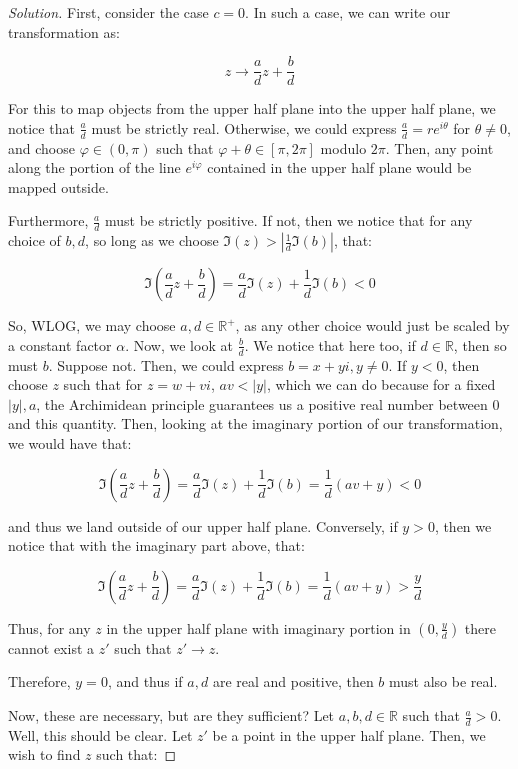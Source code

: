 \documentclass[10pt]{article}
\begin{document}
\begin{proof}[Solution]

First, consider the case $c = 0$. In such a case, we can write our transformation as:

$$ z \to \frac{a}{d} z + \frac{b}{d}$$

For this to map objects from the upper half plane into the upper half plane, we notice that $\frac{a}{d}$ must be strictly real. Otherwise, we could express $\frac{a}{d} = re^{i\theta}$ for $\theta \not = 0$, and choose $\varphi \in (0,\pi)$ such that $\varphi + \theta \in [\pi, 2\pi]$ modulo $2\pi$. Then, any point along the portion of the line $e^{i \varphi}$ contained in the upper half plane would be mapped outside.

Furthermore, $\frac{a}{d}$ must be strictly positive. If not, then we notice that for any choice of $b, d$, so long as we choose $\Im(z) > |\frac{1}{d}\Im(b)|$, that:

$$\Im\left(\frac{a}{d} z + \frac{b}{d}\right) = \frac{a}{d} \Im(z) + \frac{1}{d} \Im(b) < 0$$

So, WLOG, we may choose $a, d \in \mathbb{R}^+$, as any other choice would just be scaled by a constant factor $\alpha$. Now, we look at $\frac{b}{d}$. We notice that here too, if $d \in \mathbb{R}$, then so must $b$. Suppose not. Then, we could express $b = x + yi, y \not = 0$. If $y < 0$, then choose $z$ such that for $z = w + vi$, $av < |y|$, which we can do because for a fixed $|y|, a$, the Archimidean principle guarantees us a positive real number between 0 and this quantity. Then, looking at the imaginary portion of our transformation, we would have that:

$$\Im\left(\frac{a}{d} z + \frac{b}{d}\right) = \frac{a}{d} \Im(z) + \frac{1}{d} \Im(b) = \frac{1}{d}(av + y)  < 0$$

and thus we land outside of our upper half plane. Conversely, if $y > 0$, then we notice that with the imaginary part above, that:

$$\Im\left(\frac{a}{d} z + \frac{b}{d}\right) = \frac{a}{d} \Im(z) + \frac{1}{d} \Im(b) = \frac{1}{d}(av + y)   > \frac{y}{d}$$

Thus, for any $z$ in the upper half plane with imaginary portion in $(0,\frac{y}{d})$ there cannot exist a $z'$ such that $z' \to z$.

Therefore, $y = 0$, and thus if $a,d$ are real and positive, then $b$ must also be real.

Now, these are necessary, but are they sufficient? Let $a,b,d \in \mathbb{R}$ such that $\frac{a}{d} > 0$. Well, this should be clear. Let $z'$ be a point in the upper half plane. Then, we wish to find $z$ such that:


\end{proof}
\end{document}
